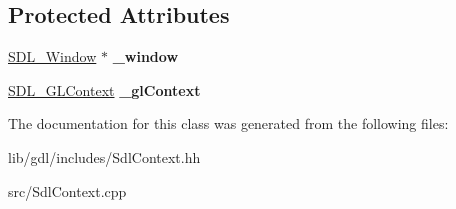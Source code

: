 \subsection*{Protected Attributes}
\begin{DoxyCompactItemize}
\item 
\hypertarget{classgdl_1_1_sdl_context_a3c298835a8a3e236d389efeb6c1d3303}{}\hyperlink{_s_d_l__video_8h_a55a196c7d3b8497538632c79ae1e6392}{S\+D\+L\+\_\+\+Window} $\ast$ {\bfseries \+\_\+window}\label{classgdl_1_1_sdl_context_a3c298835a8a3e236d389efeb6c1d3303}

\item 
\hypertarget{classgdl_1_1_sdl_context_a8a997eff1d38bc784ee95ce76db93359}{}\hyperlink{_s_d_l__video_8h_a0d64dcf67c9685d09cbe051448e1b3f3}{S\+D\+L\+\_\+\+G\+L\+Context} {\bfseries \+\_\+gl\+Context}\label{classgdl_1_1_sdl_context_a8a997eff1d38bc784ee95ce76db93359}

\end{DoxyCompactItemize}


The documentation for this class was generated from the following files\+:\begin{DoxyCompactItemize}
\item 
lib/gdl/includes/Sdl\+Context.\+hh\item 
src/Sdl\+Context.\+cpp\end{DoxyCompactItemize}
